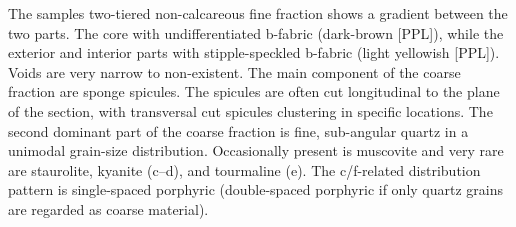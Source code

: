 \documentclass[a4paper]{article}
\begin{document}
\begin{multicols}{2}
\noindent The samples two-tiered non-calcareous fine fraction shows a gradient between the two parts. The core with undifferentiated b-fabric (dark-brown [PPL]), while the exterior and interior parts with stipple-speckled b-fabric (light yellowish [PPL]). Voids are very narrow to non-existent. The main component of the coarse fraction are sponge spicules. The spicules are often cut longitudinal to the plane of the section, with transversal cut spicules clustering in specific locations. The second dominant part of the coarse fraction is fine, sub-angular quartz in a unimodal grain-size distribution. Occasionally present is muscovite and very rare are staurolite, kyanite (c--d), and tourmaline (e). The c/f-related distribution pattern is single-spaced porphyric (double-spaced porphyric if only quartz grains are regarded as coarse material).
\end{multicols}
\end{document}
